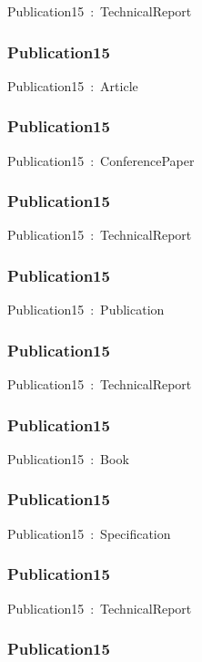 \documentclass{article}
\begin{document}
Publication15~:~TechnicalReport

\subsubsection*{Publication15}

Publication15~:~Article

\subsubsection*{Publication15}

Publication15~:~ConferencePaper

\subsubsection*{Publication15}

Publication15~:~TechnicalReport

\subsubsection*{Publication15}

Publication15~:~Publication

\subsubsection*{Publication15}

Publication15~:~TechnicalReport

\subsubsection*{Publication15}

Publication15~:~Book

\subsubsection*{Publication15}

Publication15~:~Specification

\subsubsection*{Publication15}

Publication15~:~TechnicalReport

\subsubsection*{Publication15}
\end{document}

